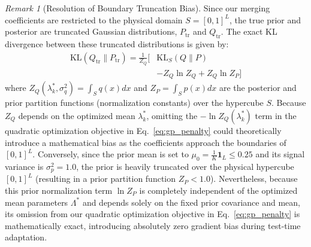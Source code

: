 \documentclass{article}
\theoremstyle{plain}
\theoremstyle{definition}
\theoremstyle{remark}
\newtheorem{remark}{Remark}
\begin{document}
\begin{remark}[Resolution of Boundary Truncation Bias]
Since our merging coefficients are restricted to the physical domain $S = [0, 1]^L$, the true prior and posterior are truncated Gaussian distributions, $P_{\text{tr}}$ and $Q_{\text{tr}}$. The exact KL divergence between these truncated distributions is given by:
\begin{equation}
\begin{aligned}
\text{KL}(Q_{\text{tr}} \| P_{\text{tr}}) = \frac{1}{Z_Q} \Big[ &\text{KL}_S(Q \| P) \\
&- Z_Q \ln Z_Q + Z_Q \ln Z_P \Big]
\end{aligned}
\end{equation}
where $Z_Q(\lambda_k^*, \sigma_q^2) = \int_S q(x) dx$ and $Z_P = \int_S p(x) dx$ are the posterior and prior partition functions (normalization constants) over the hypercube $S$. Because $Z_Q$ depends on the optimized mean $\lambda_k^*$, omitting the $-\ln Z_Q(\lambda_k^*)$ term in the quadratic optimization objective in Eq.~\ref{eq:gp_penalty} could theoretically introduce a mathematical bias as the coefficients approach the boundaries of $[0, 1]^L$. Conversely, since the prior mean is set to $\mu_0 = \frac{1}{K}\mathbf{1}_L \le 0.25$ and its signal variance is $\sigma_p^2 = 1.0$, the prior is heavily truncated over the physical hypercube $[0, 1]^L$ (resulting in a prior partition function $Z_P < 1.0$). Nevertheless, because this prior normalization term $\ln Z_P$ is completely independent of the optimized mean parameters $\Lambda^*$ and depends solely on the fixed prior covariance and mean, its omission from our quadratic optimization objective in Eq.~\ref{eq:gp_penalty} is mathematically exact, introducing absolutely zero gradient bias during test-time adaptation.


\end{remark}
\end{document}
